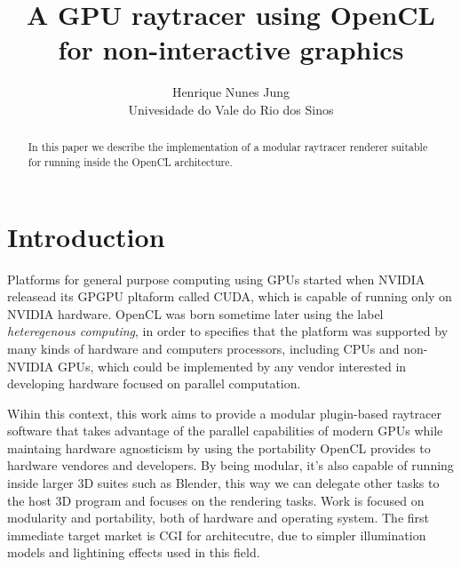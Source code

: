 \documentclass[a4paper]{sbgames}               %
\title{A GPU raytracer using OpenCL for non-interactive graphics}
\author{Henrique Nunes Jung\\ Univesidade do Vale do Rio dos Sinos
}
\begin{document}
\teaser{

}


\maketitle


\begin{abstract}

  In this paper we describe the implementation of a modular raytracer
  renderer suitable for running inside the OpenCL architecture.
\end{abstract}

\keywordlist
\contactlist

\section{Introduction}

Platforms for general purpose computing using GPUs started when NVIDIA
releasead its GPGPU pltaform called CUDA, which is capable of running
only on NVIDIA hardware. OpenCL was born sometime later using the
label \emph{heteregenous computing}, in order to specifies that the
platform was supported by many kinds of hardware and computers
processors, including CPUs and non-NVIDIA GPUs, which could be
implemented by any vendor interested in developing hardware focused on
parallel computation.

Wihin this context, this work aims to provide a modular plugin-based
raytracer software that takes advantage of the parallel capabilities
of modern GPUs while maintaing hardware agnosticism by using the
portability OpenCL provides to hardware vendores and developers. By
being modular, it's also capable of running inside larger 3D suites
such as Blender, this way we can delegate other tasks to the host 3D
program and focuses on the rendering tasks. Work is focused on
modularity and portability, both of hardware and operating system. The
first immediate target market is CGI for architecutre, due to simpler
illumination models and lightining effects used in this field.
\end{document}
